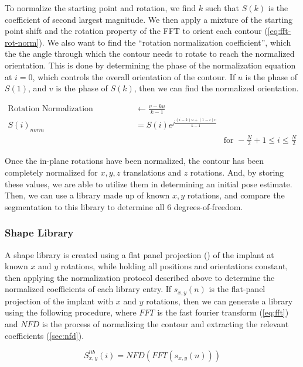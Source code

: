 To normalize the starting point and rotation, we find $k$ such that $S(k)$ is the coefficient of second largest magnitude. We then apply a mixture of the starting point shift and the rotation property of the FFT to orient each contour (\cref{eq:fft-rot-norm}). We also want to find the ``rotation normalization coefficient'', which the the angle through which the contour needs to rotate to reach the normalized orientation. This is done by determining the phase of the normalization equation at $i = 0$, which controls the overall orientation of the contour. If $u$ is the phase of $S(1)$, and $v$ is the phase of $S(k)$, then we can find the normalized orientation.

\begin{equation}
    \begin{aligned}
    \text{Rotation Normalization Coefficient} &\leftarrow \frac{v - ku}{k-1}\\
    S(i)_{norm} &= S(i)e^{j\frac{(i-k)u + (1-i)v}{k-1}} & \\
    & & \text{for } - \frac{N}{2}+1 \le i \le \frac{N}{2}
    \end{aligned}
    \label{eq:fft-rot-norm}
\end{equation}

Once the in-plane rotations have been normalized, the contour has been completely normalized for $x, y,z$ translations and $z$ rotations. And, by storing these values, we are able to utilize them in determining an initial pose estimate. Then, we can use a library made up of known $x,y$ rotations, and compare the segmentation to this library to determine all 6 degrees-of-freedom.

\subsubsection{Shape Library}
A shape library is created using a flat panel projection () of the implant at known $x$ and $y$ rotations, while holding all positions and orientations constant, then applying the normalization protocol described above to determine the normalized coefficients of each library entry. If $s_{x,y}(n)$ is the flat-panel projection of the implant with $x$ and $y$ rotations, then we can generate a library using the following procedure, where $FFT$ is the fast fourier transform (\cref{eq:fft}) and $NFD$ is the process of normalizing the contour and extracting the relevant coefficients (\cref{sec:nfd}).

\begin{equation}
    S^{lib}_{x,y}(i) = NFD(FFT(s_{x,y}(n)))
    \label{eq:lib-generation}
\end{equation}

